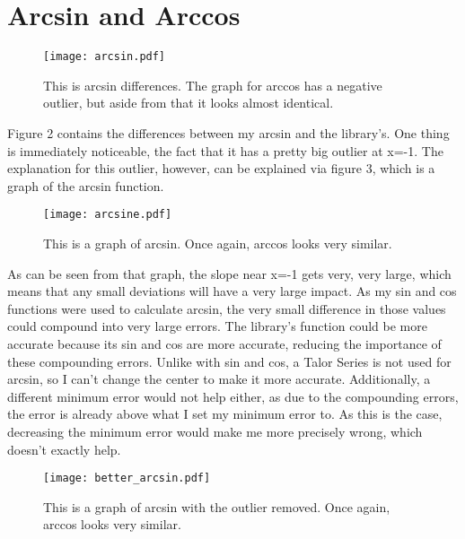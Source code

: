\documentclass[11pt]{article}
\begin{document}
\section{Arcsin and Arccos}

\begin{figure}[tbp]
    \begin{centering}
    \texttt{[image: arcsin.pdf]}
    \caption{This is arcsin differences. The graph for arccos has a negative outlier, but aside from that it looks almost identical.}
    \end{centering}
\end{figure}

Figure 2 contains the differences between my arcsin and the library's. One thing is immediately noticeable, the fact that it has a pretty big outlier at x=-1. The explanation for this outlier, however, can be explained via figure 3, which is a graph of the arcsin function.

\begin{figure}[tbp]
    \begin{centering}
    \texttt{[image: arcsine.pdf]}
    \caption{This is a graph of arcsin. Once again, arccos looks very similar.}
    \end{centering}
\end{figure}

As can be seen from that graph, the slope near x=-1 gets very, very large, which means that any small deviations will have a very large impact. As my sin and cos functions were used to calculate arcsin, the very small difference in those values could compound into very large errors. The library's function could be more accurate because its sin and cos are more accurate, reducing the importance of these compounding errors. Unlike with sin and cos, a Talor Series is not used for arcsin, so I can't change the center to make it more accurate. Additionally, a different minimum error would not help either, as due to the compounding errors, the error is already above what I set my minimum error to. As this is the case, decreasing the minimum error would make me more precisely wrong, which doesn't exactly help.

\begin{figure}[tbp]
    \begin{centering}
    \texttt{[image: better\_arcsin.pdf]}
    \caption{This is a graph of arcsin with the outlier removed. Once again, arccos looks very similar.}
    \end{centering}
\end{figure}
\end{document}
